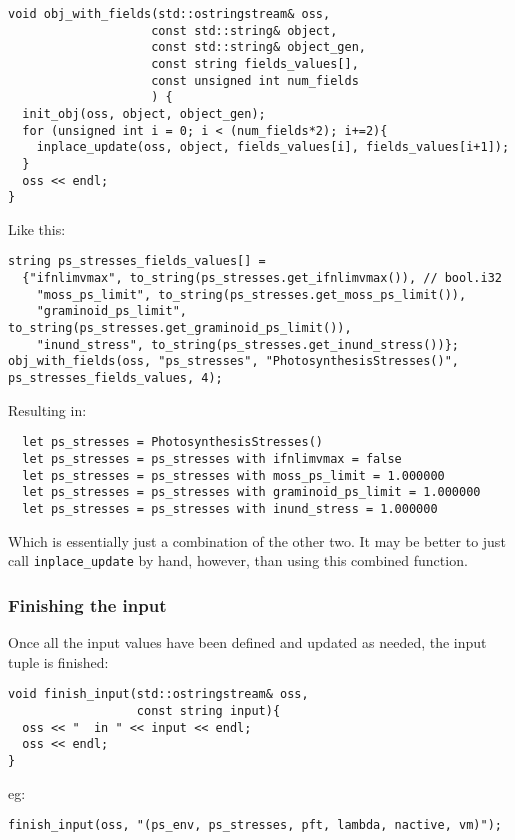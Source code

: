 \begin{verbatim}
void obj_with_fields(std::ostringstream& oss,
                    const std::string& object,
                    const std::string& object_gen,
                    const string fields_values[],
                    const unsigned int num_fields
                    ) {
  init_obj(oss, object, object_gen);
  for (unsigned int i = 0; i < (num_fields*2); i+=2){
    inplace_update(oss, object, fields_values[i], fields_values[i+1]);
  }
  oss << endl;
}
\end{verbatim}

Like this:

\begin{verbatim}
string ps_stresses_fields_values[] =
  {"ifnlimvmax", to_string(ps_stresses.get_ifnlimvmax()), // bool.i32
    "moss_ps_limit", to_string(ps_stresses.get_moss_ps_limit()),
    "graminoid_ps_limit", to_string(ps_stresses.get_graminoid_ps_limit()),
    "inund_stress", to_string(ps_stresses.get_inund_stress())};
obj_with_fields(oss, "ps_stresses", "PhotosynthesisStresses()", ps_stresses_fields_values, 4);
\end{verbatim}

Resulting in:

\begin{verbatim}
  let ps_stresses = PhotosynthesisStresses()
  let ps_stresses = ps_stresses with ifnlimvmax = false
  let ps_stresses = ps_stresses with moss_ps_limit = 1.000000
  let ps_stresses = ps_stresses with graminoid_ps_limit = 1.000000
  let ps_stresses = ps_stresses with inund_stress = 1.000000
\end{verbatim}

Which is essentially just a combination of the other two. It may be better to just call \texttt{inplace_update} by hand, however, than using this combined function.


\subsubsection*{Finishing the input}
Once all the input values have been defined and updated as needed, the input tuple is finished:


\begin{verbatim}
void finish_input(std::ostringstream& oss,
                  const string input){
  oss << "  in " << input << endl;
  oss << endl;
}
\end{verbatim}

eg:

\begin{verbatim}
finish_input(oss, "(ps_env, ps_stresses, pft, lambda, nactive, vm)");
\end{verbatim}

